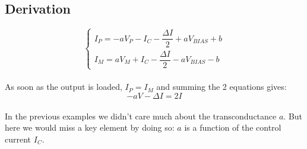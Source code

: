 \documentclass[10pt]{article}
\begin{document}
\subsection*{Derivation}

$$
\left\{
	\begin{array}{ll}
		I_P = -a V_P - I_C - \dfrac{\Delta I}{2} + a V_{BIAS} + b\\
		I_M = a V_M + I_C - \dfrac{\Delta I}{2} - a V_{BIAS} - b
	\end{array}
\right.
$$\\

As soon as the output is loaded, $I_P = I_M$ and summing the 2 equations gives:
$$
-a V -\Delta I = 2I
$$\\

In the previous examples we didn't care much about the transconductance $a$. But here we would miss a key element by doing so: $a$ is a function of the control current $I_C$.


\end{document}
